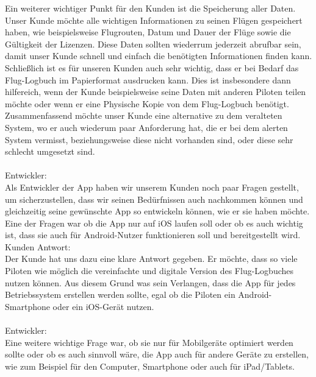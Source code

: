 \documentclass[a4paper]{article} %
\begin{document}
    \noindent Ein weiterer wichtiger Punkt für den Kunden ist die Speicherung aller Daten. Unser Kunde möchte alle wichtigen Informationen zu seinen Flügen gespeichert haben, wie beispielsweise Flugrouten, Datum und Dauer der Flüge sowie die Gültigkeit der Lizenzen. Diese Daten sollten wiederrum jederzeit abrufbar sein, damit unser Kunde schnell und einfach die benötigten Informationen finden kann.
    Schließlich ist es für unseren Kunden auch sehr wichtig, dass er bei Bedarf das Flug-Logbuch im Papierformat ausdrucken kann. Dies ist insbesondere dann hilfereich, wenn der Kunde beispielsweise seine Daten mit anderen Piloten teilen möchte oder wenn er eine Physische Kopie von dem Flug-Logbuch benötigt.\\
    Zusammenfassend möchte unser Kunde eine alternative zu dem veralteten System, wo er auch wiederum paar Anforderung hat, die er bei dem alerten System vermisst, beziehungsweise diese nicht vorhanden sind, oder diese sehr schlecht umgesetzt sind.\\  
    \vspace{0.5cm}\\
    \noindent Entwickler:\\
    Als Entwickler der App haben wir unserem Kunden noch paar Fragen gestellt, um sicherzustellen, dass wir seinen Bedürfnissen auch nachkommen können und gleichzeitig seine gewünschte App so entwickeln können, wie er sie haben möchte. Eine der Fragen war ob die App nur auf iOS laufen soll oder ob es auch wichtig ist, dass sie auch für Android-Nutzer funktionieren soll und bereitgestellt wird.\\
    
    \noindent Kunden Antwort:\\
    Der Kunde hat uns dazu eine klare Antwort gegeben. 
    Er möchte, dass so viele Piloten wie möglich die vereinfachte und digitale Version des Flug-Logbuches nutzen können. Aus diesem Grund was sein Verlangen, dass die App für jedes Betriebssystem erstellen werden sollte, egal ob die Piloten ein Android-Smartphone oder ein iOS-Gerät nutzen.\\
    \pagebreak
    \vspace{1cm}\\
    \noindent Entwickler:\\
    Eine weitere wichtige Frage war, ob sie nur für Mobilgeräte optimiert werden sollte oder ob es auch sinnvoll wäre, die App auch für andere Geräte zu erstellen, wie zum Beispiel für den Computer, Smartphone oder auch für iPad/Tablets.\\
    
\end{document}
